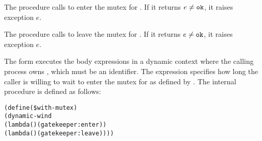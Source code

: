 The  procedure calls  to enter the
mutex for . If it returns $e \ne \code{ok}$, it raises
exception $e$.

\begin{procedure}
\end{procedure}
\returns{} 

The  procedure calls  to leave the mutex for
. If it returns $e \ne \code{ok}$, it raises exception
$e$.

\begin{syntax}
\end{syntax}
\expandsto{}

The  form executes the body expressions in a
dynamic context where the calling process owns , which
must be an identifier. The  expression specifies how long
the caller is willing to wait to enter the mutex for  as
defined by .  The internal
 procedure is defined as follows:\antipar
\begin{samepage}\begin{alltt}
(define (\$with-mutex   )
  (dynamic-wind
    (lambda () (gatekeeper:enter  ))
    (lambda () (gatekeeper:leave ))))
\end{alltt}\end{samepage}
